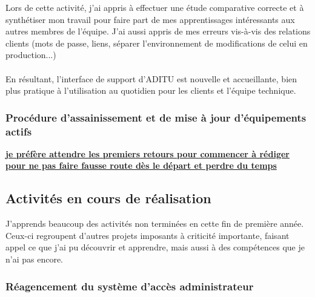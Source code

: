 Lors de cette activité, j'ai appris à effectuer une étude comparative correcte et à synthétiser mon travail pour faire part de mes apprentissages intéressants aux autres membres de l'équipe. J'ai aussi appris de mes erreurs vis-à-vis des relations clients (mots de passe, liens, séparer l'environnement de modifications de celui en production...)
\\ \\
En résultant, l'interface de support d'ADITU est nouvelle et accueillante, bien plus pratique à l'utilisation au quotidien pour les clients et l'équipe technique.

\subsubsection{Procédure d'assainissement et de mise à jour d'équipements actifs}


\underline{\textbf{je préfère attendre les premiers retours pour commencer à rédiger}}
\underline{\textbf{pour ne pas faire fausse route dès le départ et perdre du temps}}


\subsection{Activités en cours de réalisation}

J'apprends beaucoup des activités non terminées en cette fin de première année. Ceux-ci regroupent d'autres projets imposants à criticité importante, faisant appel ce que j'ai pu découvrir et apprendre, mais aussi à des compétences que je n'ai pas encore.

\subsubsection{Réagencement du système d'accès administrateur}


